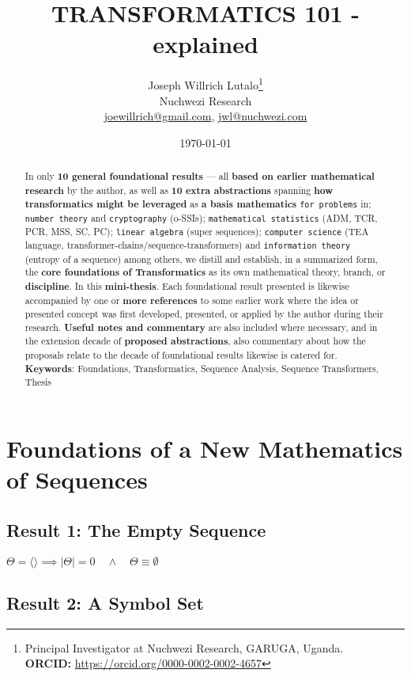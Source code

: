 \documentclass[12pt,a4paper]{article}
\title{TRANSFORMATICS 101 - explained}
\author{Joseph Willrich Lutalo\thanks{Principal Investigator at Nuchwezi Research, GARUGA, Uganda.\\ \textbf{ORCID:} \url{https://orcid.org/0000-0002-0002-4657}}\\Nuchwezi Research\\\href{mailto:joewillrich@gmail.com}{joewillrich@gmail.com}, \href{mailto:jwl@nuchwezi.com}{jwl@nuchwezi.com}}
\date \today
\begin{document}
\maketitle

\begin{abstract}
In only \textbf{10 general foundational results}\cite{Lutalo2025_trans_101}\cite{lutalo_2025_trans101_1page} --- all \textbf{based on earlier mathematical research} by the author, as well as \textbf{10 extra abstractions} spanning \textbf{how transformatics might be leveraged} as \textbf{a basis mathematics} \texttt{for problems} in; \texttt{number theory} and \texttt{cryptography} (o-SSIs); \texttt{mathematical statistics} (ADM, TCR, PCR, MSS, SC, PC); \texttt{linear algebra} (super sequences); \texttt{computer science} (TEA language, transformer-chains/sequence-transformers) and \texttt{information theory} (entropy of a sequence) among others, we distill and establish, in a summarized form, the \textbf{core foundations of Transformatics}\cite{transformatics} as its own mathematical theory, branch, or \textbf{discipline}. In this \textbf{mini-thesis}. Each foundational result presented is likewise accompanied by one or \textbf{more references} to some earlier work where the idea or presented concept was first developed, presented, or applied by the author during their research. \textbf{Useful notes and commentary} are also included where necessary, and in the extension decade of \textbf{proposed abstractions}, also commentary about how the proposals relate to the decade of foundational results likewise is catered for.
 \newline\newline
     \textbf{Keywords}: Foundations, Transformatics, Sequence Analysis,  Sequence Transformers, Thesis
\end{abstract}

\section{Foundations of a New Mathematics of Sequences}

\subsection{Result 1: The Empty Sequence\cite{lnspaper}}

$\Theta = \langle \rangle \implies |\Theta| = 0 \quad \land \quad \Theta \equiv \emptyset$

\subsection{Result 2: A Symbol Set\cite{Lutalo2024gtnc}}
\end{document}
